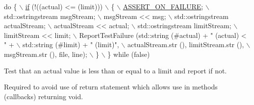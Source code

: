 \begin{DoxyCode}
\textcolor{keywordflow}{do} \{                                                                  \hyperlink{loss__ITU1238_8m_a419d895abe1313c35fa353c93802647e}{\(\backslash\)}
\hyperlink{loss__ITU1238_8m_a419d895abe1313c35fa353c93802647e}{    if} (!((actual) <= (limit)))                                         \(\backslash\)
      \{                                                                 \hyperlink{group__testing_ga044d7c8c214fe3761af96ee3cbe2edc3}{\(\backslash\)}
\hyperlink{group__testing_ga044d7c8c214fe3761af96ee3cbe2edc3}{        ASSERT\_ON\_FAILURE};                                              \(\backslash\)
        std::ostringstream msgStream;                                   \(\backslash\)
        msgStream << msg;                                               \(\backslash\)
        std::ostringstream actualStream;                                \(\backslash\)
        actualStream << actual;                                         \(\backslash\)
        std::ostringstream limitStream;                                 \(\backslash\)
        limitStream << limit;                                           \(\backslash\)
        ReportTestFailure (std::string (#actual) + \textcolor{stringliteral}{" (actual) < "} +     \(\backslash\)
                       std::string (#limit) + \textcolor{stringliteral}{" (limit)"},               \(\backslash\)
                       actualStream.str (), limitStream.str (),         \(\backslash\)
                       msgStream.str (), file, line);                   \(\backslash\)
      \}                                                                 \(\backslash\)
  \} \textcolor{keywordflow}{while} (\textcolor{keyword}{false})
\end{DoxyCode}


Test that an actual value is less than or equal to a limit and report if not. 

Required to avoid use of return statement which allows use in methods (callbacks) returning void. 
